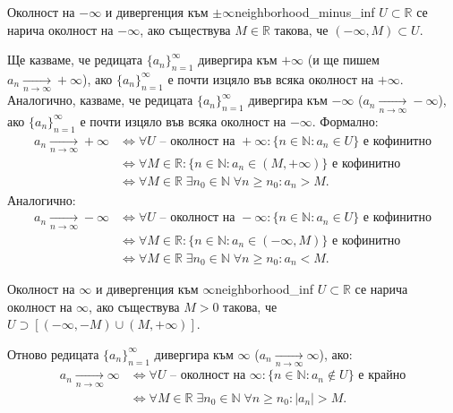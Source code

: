 \begin{definition}{Околност на $-\infty$ и дивергенция към $\pm\infty$}{neighborhood_minus_inf}
$U \subset \mathbb{R}$ се нарича околност на $-\infty$, ако съществува $M \in \mathbb{R}$ такова, че $(-\infty, M) \subset U$.

Ще казваме, че редицата $\{a_n\}_{n=1}^{\infty}$ дивергира към $+\infty$ (и ще пишем $a_n \xrightarrow[n\to\infty]{} +\infty$), ако $\{a_n\}_{n=1}^{\infty}$ е почти изцяло във всяка околност на $+\infty$. Аналогично, казваме, че редицата $\{a_n\}_{n=1}^{\infty}$ дивергира към $-\infty$ ($a_n \xrightarrow[n\to\infty]{} -\infty$), ако $\{a_n\}_{n=1}^{\infty}$ е почти изцяло във всяка околност на $-\infty$. Формално:
\begin{align*}
a_n \xrightarrow[n\to\infty]{} +\infty &\iff \forall U \text{ -- околност на } +\infty : \{n \in \mathbb{N} : a_n \in U\} \text{ е кофинитно} \\
&\iff \forall M \in \mathbb{R} : \{n \in \mathbb{N} : a_n \in (M, +\infty)\} \text{ е кофинитно} \\
&\iff \forall M \in \mathbb{R} \; \exists n_0 \in \mathbb{N} \; \forall n \ge n_0 : a_n > M.
\end{align*}
Аналогично:
\begin{align*}
a_n \xrightarrow[n\to\infty]{} -\infty &\iff \forall U \text{ -- околност на } -\infty : \{n \in \mathbb{N} : a_n \in U\} \text{ е кофинитно} \\
&\iff \forall M \in \mathbb{R} : \{n \in \mathbb{N} : a_n \in (-\infty, M)\} \text{ е кофинитно} \\
&\iff \forall M \in \mathbb{R} \; \exists n_0 \in \mathbb{N} \; \forall n \ge n_0 : a_n < M.
\end{align*}
\end{definition}

\begin{definition}{Околност на $\infty$ и дивергенция към $\infty$}{neighborhood_inf}
$U \subset \mathbb{R}$ се нарича околност на $\infty$, ако съществува $M > 0$ такова, че $U \supset [(-\infty, -M) \cup (M, +\infty)]$.

Отново редицата $\{a_n\}_{n=1}^{\infty}$ дивергира към $\infty$ ($a_n \xrightarrow[n\to\infty]{} \infty$), ако:
\begin{align*}
a_n \xrightarrow[n\to\infty]{} \infty &\iff \forall U \text{ -- околност на } \infty : \{n \in \mathbb{N} : a_n \notin U\} \text{ е крайно} \\
&\iff \forall M \in \mathbb{R} \; \exists n_0 \in \mathbb{N} \; \forall n \ge n_0 : |a_n| > M.
\end{align*}
\end{definition}

